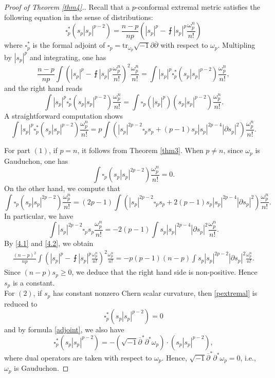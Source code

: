 \documentclass[12pt]{amsart}
\newcommand\bp{{\bar\partial}}
\theoremstyle{plain}
\theoremstyle{definition}
\newcommand{\sq}{\sqrt{-1}}
\newcommand{\p}{\partial}
\renewcommand{\bar}{\overline}
\newcommand{\beq}{\begin{equation}}
\newcommand{\eeq}{\end{equation}}
\newcommand{\ee}{\end{eqnarray*}}
\newcommand{\be}{\begin{eqnarray*}}
\renewcommand{\bp}{\bar{\partial}}
\renewcommand{\>}{\rightarrow}
\renewcommand{\#}{\sharp}
\newcommand{\lrp}[1]{\left( #1\right)}
\numberwithin{equation}{section} %
\begin{document}
    \begin{proof}[Proof of Theorem \ref{thm4}.]
         Recall that a $p$-conformal extremal metric  satisfies the following equation in the sense of distributions:
         \beq   \square_p^*\left(s_p|s_p|^{p-2}\right)=\frac{n-p}{np}\left(|s_p|^p-\intbar|s_p|^p\frac{\omega_p^n}{n!}\right)\eeq
        where $\square_p^*$ is the formal adjoint of $\square_p=\mathrm{tr}_{\omega_p}\sq\p\bp$ with respect to $\omega_p$. Multipling by $|s_p|^p$ and integrating, one has
    \beq \frac{n-p}{np}\int\lrp{|s_p|^p-\intbar|s_p|^p\frac{\omega_p^n}{n!}}^2\frac{\omega_p^n}{n!}=\int|s_p|^p\square_p^*\left(s_p|s_p|^{p-2}\right)\frac{\omega_p^n}{n!}, \label{4.1}\eeq
    and the right hand reads
\beq \int|s_p|^p\square_p^*\lrp{s_p|s_p|^{p-2}}\frac{\omega_p^n}{n!}=\int \square_p\left(|s_p|^p\right)\lrp{s_p|s_p|^{p-2}}\frac{\omega_p^n}{n!}.\eeq
A straightforward computation shows
    \beq \int|s_p|^p\square_p^*\lrp{s_p|s_p|^{p-2}}\frac{\omega_p^n}{n!}
            =p\int\lrp{|s_p|^{2p-2}\square_ps_p+(p-1)s_p|s_p|^{2p-4}|\p s_p|^2}\frac{\omega_p^n}{n!}.\label{4.2}
    \eeq

    \noindent For part $(1)$,  if $p=n$, it follows from Theorem \ref{thm3}. When $p\neq n$, since $\omega_p$ is Gauduchon, one has
    \beq\int\square_p\lrp{s_p|s_p|^{2p-2}}\frac{\omega_p^n}{n!}=0.\eeq
    On the other hand, we compute that  $$
        \int\square_p\lrp{s_p|s_p|^{2p-2}}\frac{\omega_p^n}{n!}=(2p-1)\int\lrp{|s_p|^{2p-2}\square_ps_p+2(p-1)s_p|s_p|^{2p-4}|\p s_p|^2}\frac{\omega_p^n}{n!}.
    $$
    In particular, we have
    \beq \int |s_p|^{2p-2}\square_ps_p\frac{\omega_p^n}{n!}=-2(p-1)\int s_p|s_p|^{2p-4}|\p s_p|^2\frac{\omega_p^n}{n!}.\eeq
        \noindent
    By  \eqref{4.1} and \eqref{4.2}, we obtain
        \be
            \frac{(n-p)^2}{np}\int\lrp{|s_p|^p-\intbar|s_p|^p\frac{\omega_p^n}{n!}}^2\frac{\omega_p^n}{n!}=-p(p-1)(n-p)\int s_p|s_p|^{2p-2}|\p s_p|^2\frac{\omega_p^n}{n!}.
        \ee
        Since $(n-p)s_p\geq 0$, we deduce that the right hand side is non-positive. Hence $s_p$ is a constant.\\


    \noindent   For $(2)$, if $s_p$ has constant nonzero Chern scalar curvature, then \eqref{pextremal} is reduced to
    \beq \square_p^*\left(s_p|s_p|^{p-2}\right)=0 \eeq
    and by  formula \eqref{adjoint}, we also have  $$\square_p^*\left(s_p|s_p|^{p-2}\right)=-\left(\sq\bp^*\p^*\omega_p\right)\cdot \left(s_p|s_p|^{p-2}\right),$$
    where  dual operators are taken with respect to $\omega_p$. Hence, $\sq\bp^*\p^*\omega_p=0$, i.e.,  $\omega_p$ is Gauduchon.
    \end{proof}
\end{document}
